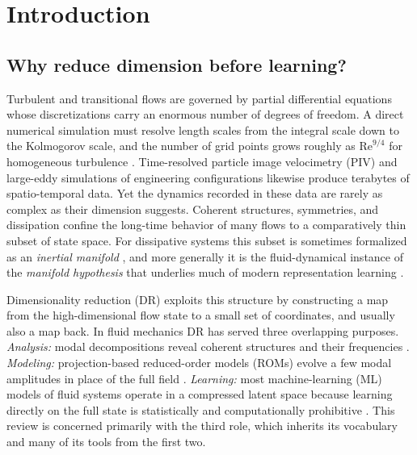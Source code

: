 \section{Introduction}
\label{sec:intro}

\subsection{Why reduce dimension before learning?}

Turbulent and transitional flows are governed by partial differential equations
whose discretizations carry an enormous number of degrees of freedom. A direct
numerical simulation must resolve length scales from the integral scale down to
the Kolmogorov scale, and the number of grid points grows roughly as
$\mathrm{Re}^{9/4}$ for homogeneous turbulence \parencite{pope2000turbulent}.
Time-resolved particle image velocimetry (PIV) and large-eddy simulations of
engineering configurations likewise produce terabytes of spatio-temporal data.
Yet the dynamics recorded in these data are rarely as complex as their
dimension suggests. Coherent structures, symmetries, and dissipation confine
the long-time behavior of many flows to a comparatively thin subset of state
space. For dissipative systems this subset is sometimes formalized as an
\emph{inertial manifold} \parencite{foias1988inertial}, and more generally it
is the fluid-dynamical instance of the \emph{manifold hypothesis} that
underlies much of modern representation learning
\parencite{bengio2013representation,fefferman2016manifold}.

Dimensionality reduction (DR) exploits this structure by constructing a map
from the high-dimensional flow state to a small set of coordinates, and
usually also a map back. In fluid mechanics DR has served three overlapping
purposes. \emph{Analysis:} modal decompositions reveal coherent structures and
their frequencies \parencite{taira2017modal,taira2020modal}. \emph{Modeling:}
projection-based reduced-order models (ROMs) evolve a few modal amplitudes in
place of the full field \parencite{holmes2012turbulence,benner2015survey,rowley2017arfm}.
\emph{Learning:} most machine-learning (ML) models of fluid systems operate in a
compressed latent space because learning directly on the full state is
statistically and computationally prohibitive
\parencite{brunton2020ml,vinuesa2022enhancing,brunton2024promising}. This
review is concerned primarily with the third role, which inherits its
vocabulary and many of its tools from the first two.

